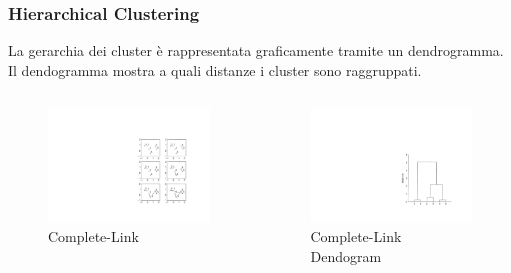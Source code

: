 \begin{frame}

	\frametitle{{\color{GradientDescentDiagramGreen}Hierarchical Clustering}}


		La gerarchia dei cluster è rappresentata graficamente tramite un dendrogramma.\\
		Il dendogramma mostra a quali distanze i cluster sono raggruppati.

		\begin{columns}

			\begin{figure}[!htbp]
				\centering
				\includegraphics[angle=0,width=0.50\linewidth]{images/unsupervised/hierarchical/hierarchical_complete_link.pdf}
				\caption{Complete-Link}
			\end{figure}

			\begin{figure}[!htbp]
				\centering
				\includegraphics[angle=0,width=0.65\linewidth]{images/unsupervised/hierarchical/hierarchical_complete_link_dendogram.pdf}
				\caption{Complete-Link Dendogram}
			\end{figure}

		\end{columns}


\end{frame}


